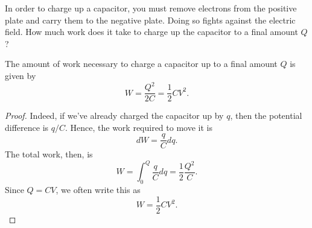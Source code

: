 In order to charge up a capacitor, you must remove electrons from the positive plate and carry them to the negative plate. Doing so fights against the electric field. How much work does it take to charge up the capacitor to a final amount $Q$?

\begin{proposition}\label{workchargecapacitor}
The amount of work necessary to charge a capacitor up to a final amount $Q$ is given by
\[W=\frac{Q^2}{2C}=\frac{1}{2}CV^2.\]
\end{proposition}

\begin{proof}
Indeed, if we've already charged the capacitor up by $q$, then the potential difference is $q/C$. Hence, the work required to move it is
\[dW=\frac{q}{C}dq.\]
The total work, then, is
\[W=\int_{0}^Q\frac{q}{C}dq=\frac{1}{2}\frac{Q^2}{C}.\]
Since $Q=CV$, we often write this as
\[W=\frac{1}{2}CV^2.\]
\end{proof}
